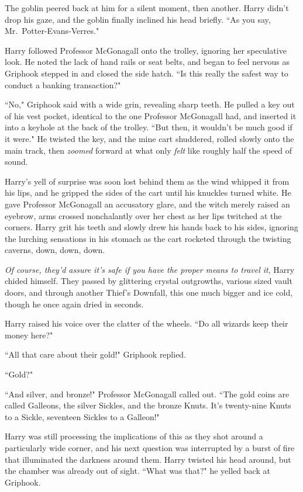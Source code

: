 The goblin peered back at him for a silent moment, then another. Harry didn't drop his gaze, and the goblin finally inclined his head briefly. ``As you say, Mr.~Potter-Evans-Verres."

Harry followed Professor McGonagall onto the trolley, ignoring her speculative look. He noted the lack of hand rails or seat belts, and began to feel nervous as Griphook stepped in and closed the side hatch. ``Is this really the safest way to conduct a banking transaction?"

``No," Griphook said with a wide grin, revealing sharp teeth. He pulled a key out of his vest pocket, identical to the one Professor McGonagall had, and inserted it into a keyhole at the back of the trolley. ``But then, it wouldn't be much good if it were." He twisted the key, and the mine cart shuddered, rolled slowly onto the main track, then \emph{zoomed} forward at what only \emph{felt} like roughly half the speed of sound.

Harry's yell of surprise was soon lost behind them as the wind whipped it from his lips, and he gripped the sides of the cart until his knuckles turned white. He gave Professor McGonagall an accusatory glare, and the witch merely raised an eyebrow, arms crossed nonchalantly over her chest as her lips twitched at the corners. Harry grit his teeth and slowly drew his hands back to his sides, ignoring the lurching sensations in his stomach as the cart rocketed through the twisting caverns, down, down, down.

\emph{Of course, they'd assure it's safe if you have the proper means to travel it}, Harry chided himself. They passed by glittering crystal outgrowths, various sized vault doors, and through another Thief's Downfall, this one much bigger and ice cold, though he once again dried in seconds.

Harry raised his voice over the clatter of the wheels. ``Do all wizards keep their money here?"

``All that care about their gold!" Griphook replied.

``Gold?"

``And silver, and bronze!" Professor McGonagall called out. ``The gold coins are called Galleons, the silver Sickles, and the bronze Knuts. It's twenty-nine Knuts to a Sickle, seventeen Sickles to a Galleon!"

Harry was still processing the implications of this as they shot around a particularly wide corner, and his next question was interrupted by a burst of fire that illuminated the darkness around them. Harry twisted his head around, but the chamber was already out of sight. ``What was that?" he yelled back at Griphook.


